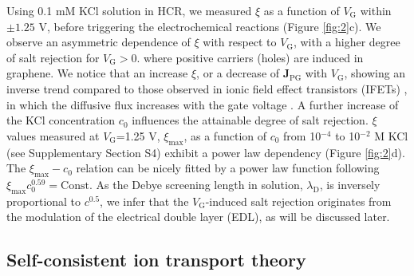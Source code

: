 \documentclass[manuscript=letter, email=true, hyperref=true, keywords=false]{achemso}
\begin{document}
Using 0.1 mM KCl solution in HCR, we measured $\xi$ as a function of
$V_{\mathrm{G}}$ within $\pm1.25$ V, before triggering the
electrochemical reactions (Figure \ref{fig:2}c). We observe an
asymmetric dependence of $\xi$ with respect to $V_{\mathrm{G}}$, with
a higher degree of salt rejection for $V_{\mathrm{G}}>0$. where
positive carriers (holes) are induced in graphene. We notice that an
increase $\xi$, or a decrease of $\boldsymbol{J}_{\mathrm{PG}}$ with
$V_{\mathrm{G}}$, showing an inverse trend compared to those observed
in ionic field effect transistors (IFETs) , in which the
diffusive flux increases with the gate voltage . A
further increase of the KCl concentration $c_{0}$ influences the
attainable degree of salt rejection. $\xi$ values measured at
$V_{\mathrm{G}}$=1.25 V, $\xi_{\mathrm{max}}$, as a function of
$c_{0}$ from 10$^{-4}$ to 10$^{-2}$ M KCl (see Supplementary Section
S4) exhibit a power law dependency (Figure \ref{fig:2}d). The
$\xi_{\mathrm{max}}-c_{0}$ relation can be nicely fitted by a power
law function following
$\xi_{\mathrm{max}} c_{0}^{0.59} = \mathrm{Const}$. As the Debye
screening length in solution, $\lambda_{\mathrm{D}}$, is inversely
proportional to $c^{0.5}$, we infer that the $V_{\mathrm{G}}$-induced
salt rejection originates from the modulation of the electrical double
layer (EDL), as will be discussed later.

\subsection{Self-consistent ion transport theory}
\label{sec:theory}
\end{document}
